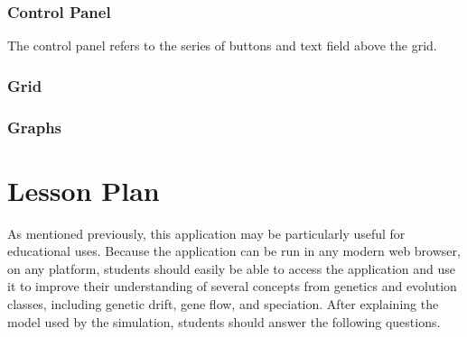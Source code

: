\documentclass[12pt]{article}
\begin{document}
\begin{spacing}{1.5}
\subsubsection{Control Panel}
The control panel refers to the series of buttons and text field above the grid.
\subsubsection{Grid}

\subsubsection{Graphs}

\section{Lesson Plan}
As mentioned previously, this application may be particularly useful for educational uses. Because the application can be run in any modern web browser, on any platform, students should easily be able to access the application and use it to improve their understanding of several concepts from genetics and evolution classes, including genetic drift, gene flow, and speciation.
After explaining the model used by the simulation, students should answer the following questions.

\end{spacing}
\end{document}
